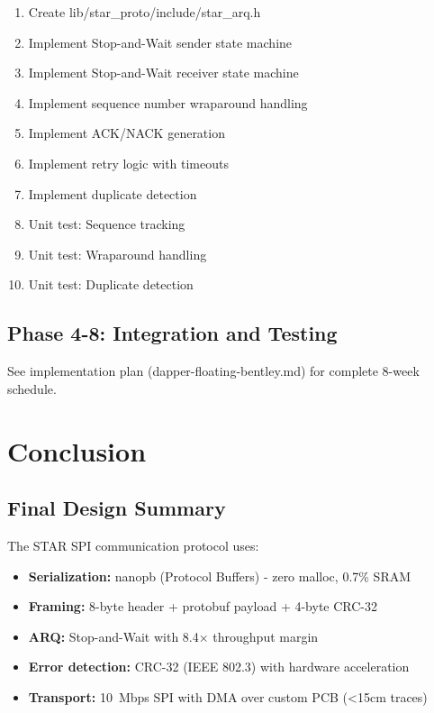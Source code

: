 \documentclass[12pt,letterpaper]{article}
\newcommand{\checkbox}{\raisebox{0.5pt}{\tikz{\draw (0,0) rectangle (0.3,0.3);}}}
\begin{document}
\begin{enumerate}[label=\protect\checkbox]
    \item Create lib/star\_proto/include/star\_arq.h
    \item Implement Stop-and-Wait sender state machine
    \item Implement Stop-and-Wait receiver state machine
    \item Implement sequence number wraparound handling
    \item Implement ACK/NACK generation
    \item Implement retry logic with timeouts
    \item Implement duplicate detection
    \item Unit test: Sequence tracking
    \item Unit test: Wraparound handling
    \item Unit test: Duplicate detection
\end{enumerate}

\subsection{Phase 4-8: Integration and Testing}

See implementation plan (dapper-floating-bentley.md) for complete 8-week schedule.

\section{Conclusion}

\subsection{Final Design Summary}

The STAR SPI communication protocol uses:
\begin{itemize}
    \item \textbf{Serialization:} nanopb (Protocol Buffers) - zero malloc, 0.7\% SRAM
    \item \textbf{Framing:} 8-byte header + protobuf payload + 4-byte CRC-32
    \item \textbf{ARQ:} Stop-and-Wait with 8.4× throughput margin
    \item \textbf{Error detection:} CRC-32 (IEEE 802.3) with hardware acceleration
    \item \textbf{Transport:} 10~Mbps SPI with DMA over custom PCB (<15cm traces)
\end{itemize}
\end{document}

